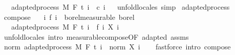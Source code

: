 \begin{isabellebody}
\ \ \ {\isachardoublequoteopen}adapted{\isacharunderscore}{\kern0pt}process\ M\ F\ t\ {\isacharparenleft}{\kern0pt}{\isasymlambda}i\ {\isacharunderscore}{\kern0pt}{\isachardot}{\kern0pt}\ c\ i{\isacharparenright}{\kern0pt}{\isachardoublequoteclose}%
\isadelimproof
\ %
\endisadelimproof
%
\isatagproof
{}\isamarkupfalse%
\ {\isacharparenleft}{\kern0pt}unfold{\isacharunderscore}{\kern0pt}locales{\isacharparenright}{\kern0pt}\ simp%
\endisatagproof
{\isafoldproof}%
%
\isadelimproof
%
\endisadelimproof
\isanewline
\isanewline
{}\isamarkupfalse%
\ adapted{\isacharunderscore}{\kern0pt}process\isanewline
{}\isanewline
\isanewline
{}\isamarkupfalse%
\ compose{\isacharcolon}{\kern0pt}\isanewline
\ \ \ {\isachardoublequoteopen}{\isasymAnd}i{\isachardot}{\kern0pt}\ f\ i\ {\isasymin}\ borel{\isacharunderscore}{\kern0pt}measurable\ borel{\isachardoublequoteclose}\isanewline
\ \ \ {\isachardoublequoteopen}adapted{\isacharunderscore}{\kern0pt}process\ M\ F\ t\ {\isacharparenleft}{\kern0pt}{\isasymlambda}i\ {\isasymxi}{\isachardot}{\kern0pt}\ {\isacharparenleft}{\kern0pt}f\ i{\isacharparenright}{\kern0pt}\ {\isacharparenleft}{\kern0pt}X\ i\ {\isasymxi}{\isacharparenright}{\kern0pt}{\isacharparenright}{\kern0pt}{\isachardoublequoteclose}\isanewline
%
\isadelimproof
\ \ %
\endisadelimproof
%
\isatagproof
{}\isamarkupfalse%
\ {\isacharparenleft}{\kern0pt}unfold{\isacharunderscore}{\kern0pt}locales{\isacharparenright}{\kern0pt}\ {\isacharparenleft}{\kern0pt}intro\ measurable{\isacharunderscore}{\kern0pt}compose{\isacharbrackleft}{\kern0pt}OF\ adapted\ assms{\isacharbrackright}{\kern0pt}{\isacharparenright}{\kern0pt}%
\endisatagproof
{\isafoldproof}%
%
\isadelimproof
\isanewline
%
\endisadelimproof
\isanewline
{}\isamarkupfalse%
\ norm{\isacharcolon}{\kern0pt}\ {\isachardoublequoteopen}adapted{\isacharunderscore}{\kern0pt}process\ M\ F\ t\ {\isacharparenleft}{\kern0pt}{\isasymlambda}i\ {\isasymxi}{\isachardot}{\kern0pt}\ norm\ {\isacharparenleft}{\kern0pt}X\ i\ {\isasymxi}{\isacharparenright}{\kern0pt}{\isacharparenright}{\kern0pt}{\isachardoublequoteclose}%
\isadelimproof
\ %
\endisadelimproof
%
\isatagproof
{}\isamarkupfalse%
\ {\isacharparenleft}{\kern0pt}fastforce\ intro{\isacharcolon}{\kern0pt}\ compose{\isacharparenright}{\kern0pt}%
\endisatagproof
{\isafoldproof}%
%
\isadelimproof
%
\endisadelimproof
\isanewline
\isanewline
{}\isamarkupfalse%

\end{isabellebody}
